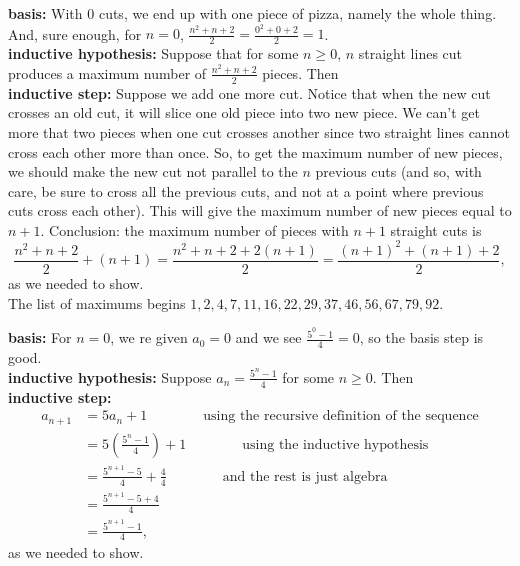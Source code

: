 \begin{Solution}{16.6}
{\bfseries basis:} With $0$ cuts, we end up with one piece of pizza, namely the whole thing. And, sure enough,
for $n=0$, $\frac{n^2+n+2}{2} = \frac{0^2 +0 + 2}{2} = 1$.\\
{\bfseries inductive hypothesis:} Suppose that  for some $n\geq 0$, $n$ straight lines cut produces a maximum
number of $\frac{n^2+n+2}{2}$ pieces. Then\\
{\bfseries inductive step:} Suppose we add one more cut. Notice that when the new cut crosses an old cut, it will slice one old piece into two new piece. We can't get more that two pieces when one cut crosses another since two straight lines cannot cross each other more than once. So, to get the maximum number of new pieces,
we should make the new cut not parallel to the $n$ previous cuts (and so, with care, be sure to cross all the
previous cuts, and not at a point where previous cuts cross each other). This will give the maximum number
of new pieces equal to $n+1$. Conclusion: the maximum number of pieces with $n+1$ straight cuts is
\[
\frac{n^2+n+2}{2} + (n+1) = \frac{n^2+n+2 +2(n+1)}{2} = \frac{(n+1)^2 +(n+1)+2}{2},
\]
as we needed to show.\\
The list of maximums begins $1,2,4,7,11,16,22,29,37,46,56,67,79, 92$.
\end{Solution}

\begin{Solution}{16.7}
{\bfseries basis:} For $n=0$, we re given $a_0= 0$ and we see $\frac{5^0-1}{4} = 0$, so the basis step is good.\\
{\bfseries inductive hypothesis:} Suppose $a_n = \frac{5^n-1}{4}$ for some $n\geq 0$. Then\\
{\bfseries inductive step:} 
\begin{align*}
a_{n+1} &= 5a_n + 1\qquad\qquad\text{using the recursive definition of the sequence}\\
 &= 5\left(\frac{5^n-1}{4}\right) + 1\qquad\qquad\text{using the inductive hypothesis}\\
 &= \frac{5^{n+1} - 5}{4} + \frac{4}{4}\qquad\qquad \text{and the rest is just algebra}\\
 &=\frac{5^{n+1} - 5+4}{4}\\
 &= \frac{5^{n+1} - 1}{4},
 \end{align*}
 as we needed to show.
\end{Solution}

